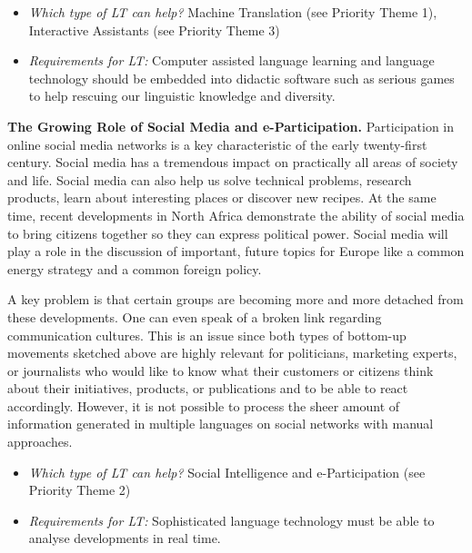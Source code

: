 \begin{multicols}{2}
\begin{itemize}
\item \emph{Which type of LT can help?} Machine Translation (see Priority Theme 1), Interactive Assistants (see Priority Theme 3)
\item \emph{Requirements for LT:} Computer assisted language learning and language technology should be embedded into didactic software such as serious games to help rescuing our linguistic knowledge and diversity.
\end{itemize}

\textbf{The Growing Role of Social Media and e-Participation.} Participation in online social media networks is a key characteristic of the early twenty-first century. Social media has a tremendous impact on practically all areas of society and life. Social media can also help us solve technical problems, research products, learn about interesting places or discover new recipes. At the same time, recent developments in North Africa demonstrate the ability of social media to bring citizens together so they can express political power. Social media will play a role in the discussion of important, future topics for Europe like a common energy strategy and a common foreign policy.

A key problem is that certain groups are becoming more and more detached from these developments. One can even speak of a broken link regarding communication cultures. This is an issue since both types of bottom-up movements sketched above are highly relevant for politicians, marketing experts, or journalists who would like to know what their customers or citizens think about their initiatives, products, or publications and to be able to react accordingly. However, it is not possible to process the sheer amount of information generated in multiple languages on social networks with manual approaches. 

\begin{itemize}
\item \emph{Which type of LT can help?} Social Intelligence and e-Participation (see Priority Theme 2)
\item \emph{Requirements for LT:} Sophisticated language technology must be able to analyse developments in real time.
\end{itemize}


\end{multicols}
